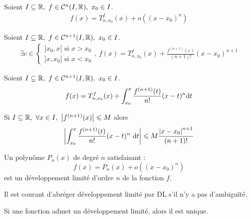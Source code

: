 \begin{theorem}
    Soient $I \subseteq \mathbb{R},\ f \in \mathcal{C}^{n}(I, \mathbb{R}),\ x_0 \in I$.
    \begin{align*}
        f(x) = T_{n, x_0}^f(x) + o((x - x_0)^n) 
    \end{align*}
\end{theorem}

\begin{theorem}
    Soient $I \subseteq \mathbb{R},\ f \in \mathcal{C}^{n+1}(I, \mathbb{R}),\ x_0 \in I$. 
    \begin{align*}
        \exists c \in 
        \begin{cases}
            ]x_0, x[ \text{ si } x > x_0 \\
            ]x, x_0[ \text{ si } x < x_0
        \end{cases},\
        f(x) = T_{n, x_0}^f(x) + 
        \frac{f^{(n+1)}(c)}{(n+1)!} (x - x_0)^{n+1}
    \end{align*}
\end{theorem}

\begin{theorem}
    Soient $I \subseteq \mathbb{R},\ f \in \mathcal{C}^{n+1}(I, \mathbb{R}),\ x_0 \in I$.
    \begin{align*}
        f(x) = T_{n, x_0}^f(x) + \int_{x_0}^{x} \frac{f^{(n+1)}(t)}{n!} (x - t)^n \diffd t
    \end{align*}
\end{theorem}

\begin{corollary}
    Si $I \subseteq \R,\ \forall x \in I,\ \abs{f^{(n+1)}(x)} \leq M$ alors
    \[ \abs{\int_{x_0}^{x} \frac{f^{(n+1)}(t)}{n!} (x - t)^n \ \diffd t} \leq M \frac{\abs{x - x_0}^{n+1}}{(n+1)!} \]
\end{corollary}

\begin{definition}
    Un polynôme $P_n(x)$ de degré $n$ satisfaisant :
    \[ f(x) = P_n(x) + o((x - x_0)^n) \]
    est un développement limité d'ordre $n$ de la fonction $f$.
\end{definition}

\begin{remark}
    Il est courant d'abréger développement limité par DL s'il n'y a pas d'ambiguïté.
\end{remark}

\begin{proposition}
    Si une fonction admet un développement limité, alors il est unique.
\end{proposition}

